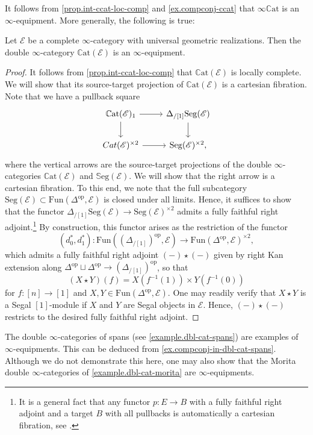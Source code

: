 \documentclass[a4paper, 11pt]{amsart}
\numberwithin{theorem}{section}
\theoremstyle{definition}
\newcommand{\cat}[1]{\textup{#1}}
\newcommand{\op}{\mathrm{op}}
\newcommand{\fun}{\mathrm{Fun}}
\newcommand{\Cat}{\cat{Cat}}
\newcommand{\E}{\mathscr{E}}
\newcommand{\Seg}{\mathrm{Seg}}
\newcommand{\SSEG}{\mathbb{S}\mathrm{eg}}
\newcommand{\CCAT}{\mathbb{C}\mathrm{at}}
\begin{document}
	It follows from \cref{prop.int-ccat-loc-comp} and \cref{ex.compconj-ccat} that $\infty\CCAT$ is an $\infty$-equipment. More generally, the following is true:
	
	\begin{proposition}\label{prop.int-ccat-equip}
		Let $\E$ be a complete $\infty$-category with universal geometric realizations. Then the  double $\infty$-category $\CCAT(\E)$ 
		is an $\infty$-equipment.
	\end{proposition}
	\begin{proof}
		It follows from \cref{prop.int-ccat-loc-comp} that $\CCAT(\E)$ is locally complete. 
		We will show that its source-target projection of $\CCAT(\E)$ is a cartesian fibration. Note that we have a pullback square 
		\[
			\begin{tikzcd}
				\CCAT(\E)_1 \arrow[r]\arrow[d] & {\Delta_{/[1]}}\Seg(\E) \arrow[d] \\
				\Cat(\E)^{\times 2} \arrow[r] & \Seg(\E)^{\times 2},
			\end{tikzcd}
		\]
		where the vertical arrows are the source-target projections of the double $\infty$-categories $\CCAT(\E)$ and $\SSEG(\E)$.  We will show that the right arrow is a cartesian fibration. 
		To this end, we note that the full subcategory $\Seg(\E) \subset \fun(\Delta^\op, \E)$ is closed under all limits.
		 Hence, it suffices to show that the functor
		$\Delta_{/[1]}\Seg(\E) \rightarrow \Seg(\E)^{\times 2}$ admits a fully faithful right adjoint.\footnote{It is a general fact that any functor $p : E \rightarrow B$ with a fully faithful right adjoint and a target $B$ with all pullbacks is automatically a cartesian fibration, see \cite[Lemma 4.4.6]{GepnerHaugseng}.}
		By construction, this functor arises as the restriction of the functor 
		$$
		(d_0^*, d_1^*) : \fun((\Delta_{/[1]})^\op, \E) \rightarrow \fun(\Delta^\op, \E)^{\times 2},
		$$
	which admits a fully faithful right adjoint $(-) \star (-)$ given by right Kan extension along $ \Delta^\op \sqcup \Delta^\op \rightarrow (\Delta_{/[1]})^\op$, so that 
	$$
	(X \star Y)(f) = X(f^{-1}(1)) \times Y(f^{-1}(0))
	$$
	for $f : [n] \rightarrow [1]$ and $X, Y \in \fun(\Delta^\op, \E)$.
	One may readily verify that $X \star Y$ is a Segal $[1]$-module if $X$ and $Y$ are Segal objects in $\E$. Hence, $(-) \star (-)$ restricts 
	to the desired fully faithful right adjoint.
	\end{proof}
	
	\begin{example}
		The double $\infty$-categories of spans (see \cref{example.dbl-cat-spans}) are examples of $\infty$-equipments.
		This can be deduced from \cref{ex.compconj-in-dbl-cat-spans}. 
		Although we do not demonstrate this here,
		one may also show that the Morita double $\infty$-categories of \cref{example.dbl-cat-morita} are $\infty$-equipments.
	\end{example}
	
\end{document}
